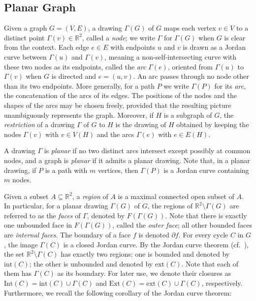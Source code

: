 \documentclass[pdflatex,sn-mathphys-num]{sn-jnl}
\theoremstyle{thmstyleone}%
\theoremstyle{thmstyletwo}%
\theoremstyle{thmstylethree}%
\begin{document}
\subsection{Planar Graph}
Given a graph $G=(V,E)$, a drawing $\Gamma(G)$ of $G$ maps each vertex $v\in V$ to a distinct point $\Gamma(v)\in\mathbb{R}^2$, called a \emph{node}; we write $\Gamma$ for $\Gamma(G)$ when $G$ is clear from the context. Each edge $e\in E$ with endpoints $u$ and $v$ is drawn as a Jordan curve between $\Gamma(u)$ and $\Gamma(v)$, meaning a non-self-intersecting curve with these two nodes as its endpoints, called the \emph{arc} $\Gamma(e)$, oriented from $\Gamma(u)$ to $\Gamma(v)$ when $G$ is directed and $e=(u,v)$. An arc passes through no node other than its two endpoints. More generally, for a path $P$ we write $\Gamma(P)$ for its \emph{arc}, the concatenation of the arcs of its edges. The positions of the nodes and the shapes of the arcs may be chosen freely, provided that the resulting picture unambiguously represents the graph.
Moreover, if $H$ is a subgraph of $G$, the \emph{restriction} of a drawing $\Gamma$ of $G$ to $H$ is the drawing of $H$ obtained by keeping the nodes $\Gamma(v)$ with $v\in V(H)$ and the arcs $\Gamma(e)$ with $e\in E(H)$.


A drawing $\Gamma$ is \emph{planar} if no two distinct arcs intersect except possibly at common nodes, and a graph is \emph{planar} if it admits a planar drawing. Note that, in a planar drawing, if $P$ is a path with $m$ vertices, then $\Gamma(P)$ is a Jordan curve containing $m$ nodes.

Given a subset $A\subseteq \mathbb{R}^2$, a \emph{region} of $A$ is a maximal connected open subset of $A$.  In particular, for a planar drawing $\Gamma(G)$ of $G$, the regions of $\mathbb{R}^2 \setminus \Gamma(G)$ are referred to as the \emph{faces} of $\Gamma$, denoted by $F(\Gamma(G))$. Note that there is exactly one unbounded face in $F(\Gamma(G))$, called the \emph{outer face}; all other bounded faces are \emph{internal faces}. The boundary of a face $f$ is denoted $\partial f$. For every cycle $C$ in $G$, the image $\Gamma(C)$ is a closed Jordan curve. By the Jordan curve theorem (cf.~\cite[Theorem 4.1.1]{Diestel}), 
the set $\mathbb{R}^2 \setminus \Gamma(C)$ has exactly two regions: one is  bounded and denoted by $\mathrm{int}(C)$; the other is unbounded and denoted by $\mathrm{ext}(C)$. Note that each of them has $\Gamma(C)$ as its boundary. For later use, we denote their closures as $\mathrm{Int}(C) = \mathrm{int}(C) \cup \Gamma(C)$ 
and $\mathrm{Ext}(C) = \mathrm{ext}(C) \cup \Gamma(C)$, respectively.
Furthermore, we recall the following corollary of the Jordan curve theorem:
\end{document}
